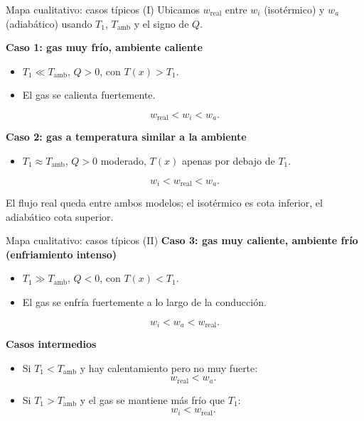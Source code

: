 \documentclass[aspectratio=169]{beamer}
\begin{document}

\begin{frame}{Mapa cualitativo: casos típicos (I)}
Ubicamos $w_{\text{real}}$ entre $w_i$ (isotérmico) y $w_a$ (adiabático) usando $T_1$, $T_{\text{amb}}$ y el signo de $Q$.

\medskip

\textbf{Caso 1: gas muy frío, ambiente caliente}
\begin{itemize}
  \item $T_1 \ll T_{\text{amb}}$, $Q>0$, con $T(x) > T_1$.
  \item El gas se calienta fuertemente.
\end{itemize}

\[
w_{\text{real}} < w_i < w_a.
\]

\pause

\textbf{Caso 2: gas a temperatura similar a la ambiente}
\begin{itemize}
  \item $T_1 \approx T_{\text{amb}}$, $Q>0$ moderado,
        $T(x)$ apenas por debajo de $T_1$.
\end{itemize}

\[
w_i < w_{\text{real}} < w_a.
\]

El flujo real queda entre ambos modelos; el isotérmico es cota inferior, el adiabático cota superior.
\end{frame}


\begin{frame}{Mapa cualitativo: casos típicos (II)}
\textbf{Caso 3: gas muy caliente, ambiente frío (enfriamiento intenso)}
\begin{itemize}
  \item $T_1 \gg T_{\text{amb}}$, $Q<0$, con $T(x)<T_1$.
  \item El gas se enfría fuertemente a lo largo de la conducción.
\end{itemize}

\[
w_i < w_a < w_{\text{real}}.
\]

\pause

\textbf{Casos intermedios}
\begin{itemize}
  \item Si $T_1 < T_{\text{amb}}$ y hay calentamiento pero no muy fuerte:
  \[
  w_{\text{real}} < w_a.
  \]
  \item Si $T_1 > T_{\text{amb}}$ y el gas se mantiene más frío que $T_1$:
  \[
  w_i < w_{\text{real}}.
  \]
\end{itemize}
\end{frame}
\end{document}
